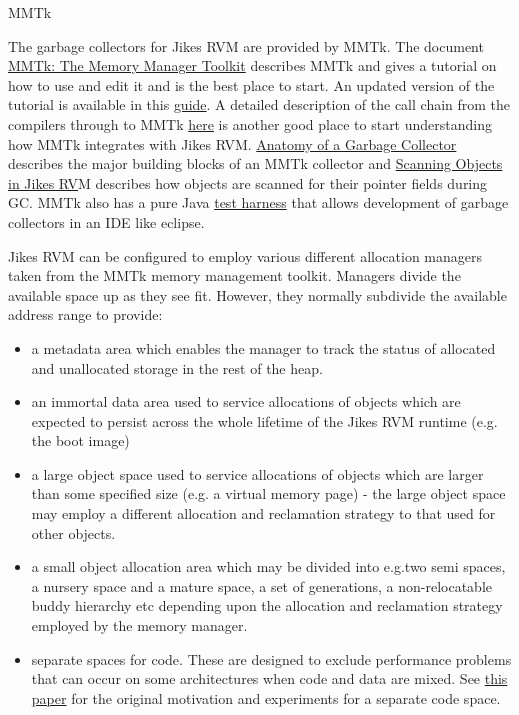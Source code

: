 \begin{section}{MMTk}
\label{sec:mmtk}

The garbage collectors for Jikes RVM are provided by MMTk. The document \href{http://cs.anu.edu.au/~Robin.Garner/mmtk-guide.pdf}{MMTk: The Memory Manager Toolkit} describes MMTk and gives a tutorial on how to use and edit it and is the best place to start.  An updated version of the tutorial is available in this \hyperref[cha:mmtktutorial]{guide}. A detailed description of the call chain from the compilers through to MMTk \hyperref[sec:memoryallocationinjikesrvm]{here} is another good place to start understanding how MMTk integrates with Jikes RVM.  \hyperref[sec:anatomyofagarbagecollector]{Anatomy of a Garbage Collector} describes the major building blocks of an MMTk collector and \hyperref[sec:scanningobjectsinjikesrvm]{Scanning Objects in Jikes RV}M describes how objects are scanned for their pointer fields during GC.  MMTk also has a pure Java \hyperref[sec:themmtktestharness]{test harness} that allows development of garbage collectors in an IDE like eclipse.

Jikes RVM can be configured to employ various different allocation managers taken from the MMTk memory management toolkit. Managers divide the available space up as they see fit. However, they normally subdivide the available address range to provide:
\begin{itemize}
  \item a metadata area which enables the manager to track the status of allocated and unallocated storage in the rest of the heap.
  \item an immortal data area used to service allocations of objects which are expected to persist across the whole lifetime of the Jikes RVM runtime (e.g. the boot image)
  \item a large object space used to service allocations of objects which are larger than some specified size (e.g. a virtual memory page) - the large object space may employ a different allocation and reclamation strategy to that used for other objects.
  \item a small object allocation area which may be divided into e.g.two semi spaces, a nursery space and a mature space, a set of generations, a non-relocatable buddy hierarchy etc depending upon the allocation and reclamation strategy employed by the memory manager.
  \item separate spaces for code. These are designed to exclude performance problems that can occur on some architectures when code and data are mixed. See \href{http://dl.acm.org/citation.cfm?doid=1133956.1133980}{this paper} for the original motivation and experiments for a separate code space.
\end{itemize}


\end{section}
